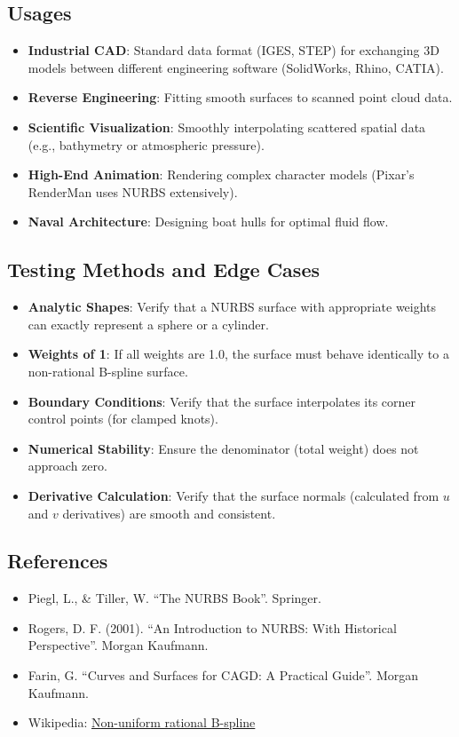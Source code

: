 \subsection{Usages}
\begin{itemize}
\item \textbf{Industrial CAD}: Standard data format (IGES, STEP) for exchanging 3D models between different engineering software (SolidWorks, Rhino, CATIA).
\item \textbf{Reverse Engineering}: Fitting smooth surfaces to scanned point cloud data.
\item \textbf{Scientific Visualization}: Smoothly interpolating scattered spatial data (e.g., bathymetry or atmospheric pressure).
\item \textbf{High-End Animation}: Rendering complex character models (Pixar's RenderMan uses NURBS extensively).
\item \textbf{Naval Architecture}: Designing boat hulls for optimal fluid flow.
\end{itemize}

\subsection{Testing Methods and Edge Cases}
\begin{itemize}
\item \textbf{Analytic Shapes}: Verify that a NURBS surface with appropriate weights can exactly represent a sphere or a cylinder.
\item \textbf{Weights of 1}: If all weights are 1.0, the surface must behave identically to a non-rational B-spline surface.
\item \textbf{Boundary Conditions}: Verify that the surface interpolates its corner control points (for clamped knots).
\item \textbf{Numerical Stability}: Ensure the denominator (total weight) does not approach zero.
\item \textbf{Derivative Calculation}: Verify that the surface normals (calculated from $u$ and $v$ derivatives) are smooth and consistent.
\end{itemize}

\subsection{References}
\begin{itemize}
\item Piegl, L., \& Tiller, W. \cite{piegl1997} ``The NURBS Book''. Springer.
\item Rogers, D. F. (2001). ``An Introduction to NURBS: With Historical Perspective''. Morgan Kaufmann.
\item Farin, G. \cite{farin2002} ``Curves and Surfaces for CAGD: A Practical Guide''. Morgan Kaufmann.
\item Wikipedia: \href{https://en.wikipedia.org/wiki/Non-uniform_rational_B-spline}{Non-uniform rational B-spline}
\end{itemize}

